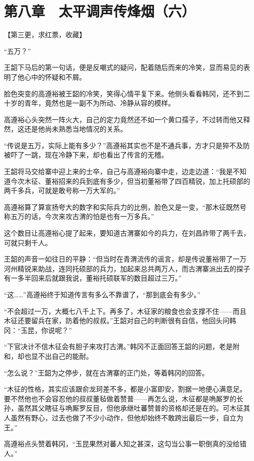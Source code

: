 \section{第八章　太平调声传烽烟（六）}

【第三更，求红票，收藏】

“五万？”

王韶下马后的第一句话，便是反嘲式的疑问，配着随后而来的冷笑，显而易见的表明了他心中的怀疑和不屑。

脸色突变的高遵裕被王韶的冷笑，笑得心情平复下来。他侧头看看韩冈，还不到二十岁的青年，竟然也是一副不为所动、冷静从容的模样。

高遵裕心头突然一阵火大，自己的定力竟然还不如一个黄口孺子，不过转而他又释然，这还是他尚未熟悉当地情况的关系。

“传说是五万，实际上能有多少？”高遵裕其实也不是不通兵事，方才只是猝不及防被吓了一跳，现在冷静下来，却也看出了传言的无稽。

王韶将马交给寨中迎上来的士卒，自己与高遵裕向寨中走，边走边道：“我是不知道今次木征、董裕招来的兵到底有多少，但当初董裕带了四百精锐，加上托硕部的两千多兵，可就是敢号称一万大军的。”

高遵裕算了算宣扬夸大的数字和实际兵力的比例，脸色又是一变，“那木征既然号称五万的话，今次来攻古渭的怕是也有一万多兵。”

这个数目让高遵裕心提了起来，要知道古渭寨如今的兵力，在刘昌祚带了两千去，可就只剩千人。

王韶的声音一如往日的平静：“但当时在青渭流传的谣言，却是传说董裕带了一万河州精锐来助战，连同托硕部的兵力，加起来总共两万人，而古渭寨派出去的探子有一多半回来后就跟我说，董裕托硕联军的数目超过三万。”

“这……”高遵裕终于知道传言有多么不靠谱了，“那到底会有多少。”

“不会超过一万，大概七八千上下。再多了，木征家的粮食也会支撑不住——而且木征还要留兵在家，防着他的叔叔。”王韶对自己的判断很有自信，他回头问韩冈：“玉昆，你说呢？”

“下官决计不信木征会有胆子来攻打古渭。”韩冈不正面回答王韶的问题，老是附和，却也显不出自己的能耐。

“怎么说？”王韶为之停步，就在古渭寨的正门处，等着韩冈的回答。

“木征的性格，其实应该跟俞龙珂差不多，都是小富即安，割据一地便心满意足。要不然他也不会容忍他的叔叔董毡做着赞普——再怎么说，木征都是唃厮罗的长孙，虽然其父瞎征与唃厮罗反目，但他承继吐蕃赞普的资格却还是在的。可木征其人虽然有野心，过去也做了不少小动作，但他却始终不敢跨出最后一步，自立为王。”

高遵裕点头赞着韩冈，“玉昆果然对蕃人知之甚深，这勾当公事一职倒真的没给错人。”

